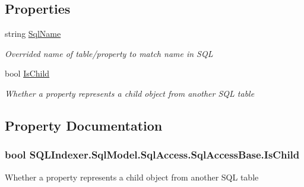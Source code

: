 \subsection*{Properties}
\begin{DoxyCompactItemize}
\item 
string \hyperlink{class_s_q_l_indexer_1_1_sql_model_1_1_sql_access_1_1_sql_access_base_a2c7e02551d342cb1ec7e03cb91100e65}{Sql\-Name}
\begin{DoxyCompactList}\small\item\em Overrided name of table/property to match name in S\-Q\-L \end{DoxyCompactList}\item 
bool \hyperlink{class_s_q_l_indexer_1_1_sql_model_1_1_sql_access_1_1_sql_access_base_aed65e88bc0e488bbb53fa35a64f5c6bd}{Is\-Child}
\begin{DoxyCompactList}\small\item\em Whether a property represents a child object from another S\-Q\-L table \end{DoxyCompactList}\end{DoxyCompactItemize}


\subsection{Property Documentation}
\hypertarget{class_s_q_l_indexer_1_1_sql_model_1_1_sql_access_1_1_sql_access_base_aed65e88bc0e488bbb53fa35a64f5c6bd}{
\subsubsection[{Is\-Child}]{\setlength{\rightskip}{0pt plus 5cm}bool S\-Q\-L\-Indexer.\-Sql\-Model.\-Sql\-Access.\-Sql\-Access\-Base.\-Is\-Child\hspace{0.3cm}{\ttfamily [get]}}}\label{class_s_q_l_indexer_1_1_sql_model_1_1_sql_access_1_1_sql_access_base_aed65e88bc0e488bbb53fa35a64f5c6bd}


Whether a property represents a child object from another S\-Q\-L table 

